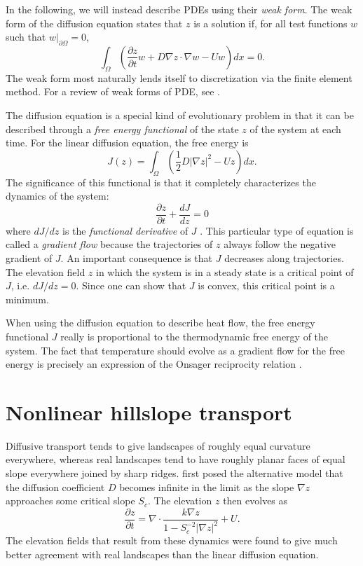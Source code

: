 \documentclass{article}
\theoremstyle{definition}
\theoremstyle{plain}
\begin{document}
In the following, we will instead describe PDEs using their \emph{weak form}.
The weak form of the diffusion equation states that $z$ is a solution if, for all test functions $w$ such that $w|_{\partial\Omega} = 0$,
\begin{equation}
    \int_\Omega\left(\frac{\partial z}{\partial t}w + D\nabla z\cdot\nabla w - Uw\right)dx = 0.
\end{equation}
The weak form most naturally lends itself to discretization via the finite element method.
For a review of weak forms of PDE, see \citet{folland1995introduction}.

The diffusion equation is a special kind of evolutionary problem in that it can be described through a \emph{free energy functional} of the state $z$ of the system at each time.
For the linear diffusion equation, the free energy is
\begin{equation}
    J(z) = \int_\Omega\left(\frac{1}{2}D|\nabla z|^2 - Uz\right)dx.
\end{equation}
The significance of this functional is that it completely characterizes the dynamics of the system:
\begin{equation}
    \frac{\partial z}{\partial t} + \frac{dJ}{dz} = 0
\end{equation}
where $dJ/dz$ is the \emph{functional derivative} of $J$ \citep{weinstock1974calculus}.
This particular type of equation is called a \emph{gradient flow} because the trajectories of $z$ always follow the negative gradient of $J$.
An important consequence is that $J$ decreases along trajectories.
The elevation field $z$ in which the system is in a steady state is a critical point of $J$, i.e. $dJ/dz = 0$.
Since one can show that $J$ is convex, this critical point is a minimum.

When using the diffusion equation to describe heat flow, the free energy functional $J$ really is proportional to the thermodynamic free energy of the system.
The fact that temperature should evolve as a gradient flow for the free energy is precisely an expression of the Onsager reciprocity relation \citep{onsager1931reciprocal}.


\section{Nonlinear hillslope transport}

Diffusive transport tends to give landscapes of roughly equal curvature everywhere, whereas real landscapes tend to have roughly planar faces of equal slope everywhere joined by sharp ridges.
\citet{roering1999evidence} first posed the alternative model that the diffusion coefficient $D$ becomes infinite in the limit as the slope $\nabla z$ approaches some critical slope $S_c$.
The elevation $z$ then evolves as
\begin{equation}
    \frac{\partial z}{\partial t} = \nabla\cdot\frac{k\nabla z}{1 - S_c^{-2}|\nabla z|^2} + U.
\label{hillslope-eqn}\end{equation}
The elevation fields that result from these dynamics were found to give much better agreement with real landscapes than the linear diffusion equation.
\end{document}
